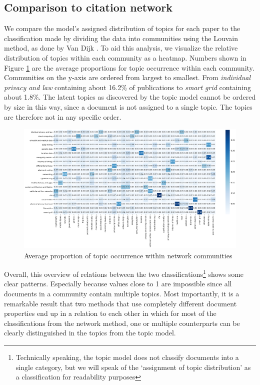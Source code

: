 \documentclass[runningheads]{llncs}
\begin{document}
\subsection{Comparison to citation network}
\label{comparison}
We compare the model's assigned distribution of topics for each paper to the classification made by dividing the data into communities using the Louvain method, as done by Van Dijk \cite{van_dijk_pillars_nodate}. To aid this analysis, we visualize the relative distribution of topics within each community as a heatmap. Numbers shown in Figure \ref{fig:square} are the average proportions for topic occurrence within each community. Communities on the y-axis are ordered from largest to smallest. From \textit{individual privacy and law} containing about 16.2\% of publications to \textit{smart grid} containing about 1.8\%. The latent topics as discovered by the topic model cannot be ordered by size in this way, since a document is not assigned to a single topic. The topics are therefore not in any specific order.

\begin{figure}
    \includegraphics[width = 1\textwidth]{figures/square.png}
    \caption{Average proportion of topic occurrence within network communities}
    \label{fig:square}
\end{figure}

Overall, this overview of relations between the two classifications\footnote{Technically speaking, the topic model does not classify documents into a single category, but we will speak of the `assignment of topic distribution' as a classification for readability purposes} shows some clear patterns. Especially because values close to 1 are impossible since all documents in a community contain multiple topics. Most importantly, it is a remarkable result that two methods that use completely different document properties end up in a relation to each other in which for most of the classifications from the network method, one or multiple counterparts can be clearly distinguished in the topics from the topic model. 
\end{document}
